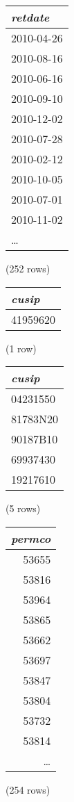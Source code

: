\begin{center}
\begin{tabular}{l}
\textit{retdate} \\
\hline
2010-04-26 \\
2010-08-16 \\
2010-06-16 \\
2010-09-10 \\
2010-12-02 \\
2010-07-28 \\
2010-02-12 \\
2010-10-05 \\
2010-07-01 \\
2010-11-02 \\
\ldots \\
\end{tabular}

\noindent (252 rows) \\
\end{center}

\begin{center}
\begin{tabular}{l}
\textit{cusip} \\
\hline
41959620 \\
\end{tabular}

\noindent (1 row) \\
\end{center}

\begin{center}
\begin{tabular}{l}
\textit{cusip} \\
\hline
04231550 \\
81783N20 \\
90187B10 \\
69937430 \\
19217610 \\
\end{tabular}

\noindent (5 rows) \\
\end{center}

\begin{center}
\begin{tabular}{r}
\textit{permco} \\
\hline
53655 \\
53816 \\
53964 \\
53865 \\
53662 \\
53697 \\
53847 \\
53804 \\
53732 \\
53814 \\
\ldots \\
\end{tabular}

\noindent (254 rows) \\
\end{center}

